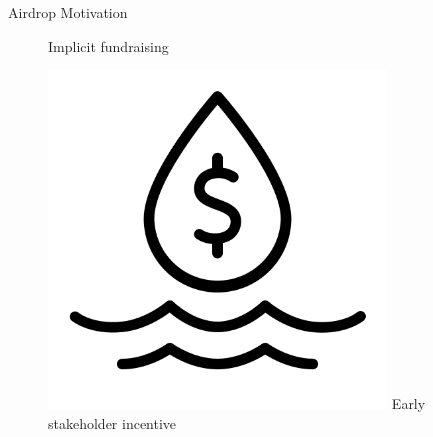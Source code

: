 \documentclass[handout]{beamer}
\begin{document}
\begin{frame}{Airdrop Motivation}
\begin{figure}[H]
\begin{minipage}[t]{.2\textwidth}
	\vspace{0.8em}\vspace{0.8em}    
    Implicit fundraising
  \end{minipage}
  \hfill
  \begin{minipage}[t]{.2\textwidth}\vspace{20pt}%
  	\center 
	\includegraphics[width=0.8\textwidth]{../assets/images/liquidity.png}
    \vspace{0.8em}\vspace{0.8em}
    Early stakeholder incentive
  \end{minipage}  
\end{figure}



\end{frame}
\end{document}
